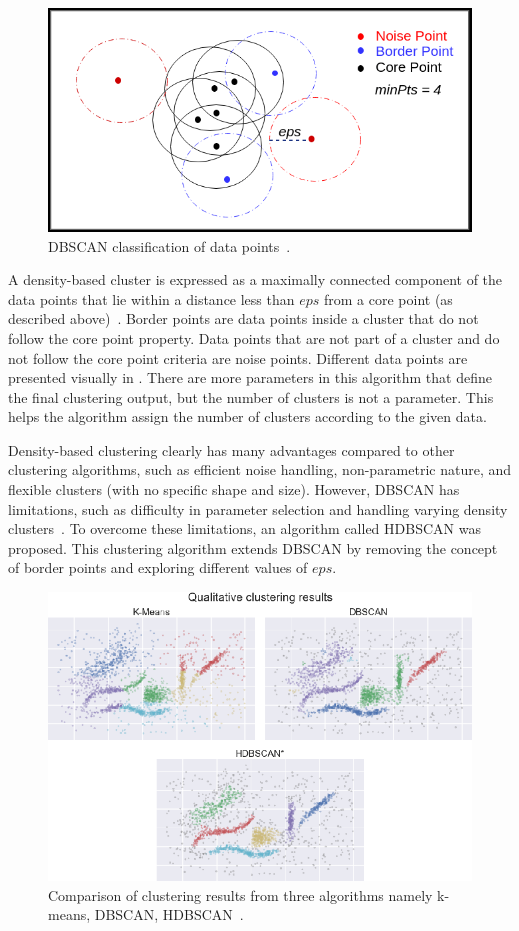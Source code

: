 \begin{description}
	
	\begin{figure}[h]
		\centering
		\includegraphics[width=.6\textwidth]{images/papers/dbscan.png}
		\caption[DBSCAN classification of data points.]{DBSCAN classification of data points~\cite{knoldusDBSCANClustering}. \label{fig:dbscan}}
	\end{figure}
	
	A density-based cluster is expressed as a maximally connected component of the data points that lie within a distance less than $eps$ from a core point (as described above)~\cite{campello2020density}. Border points are data points inside a cluster that do not follow the core point property. Data points that are not part of a cluster and do not follow the core point criteria are noise points. Different data points are presented visually in . There are more parameters in this algorithm that define the final clustering output, but the number of clusters is not a parameter. This helps the algorithm assign the number of clusters according to the given data.

	
	Density-based clustering clearly has many advantages compared to other clustering algorithms, such as efficient noise handling, non-parametric nature, and flexible clusters (with no specific shape and size). However, \ac{DBSCAN} has limitations, such as difficulty in parameter selection and handling varying density clusters~\cite{mcinnes2017accelerated}. To overcome these limitations, an algorithm called \ac{HDBSCAN} was proposed. This clustering algorithm extends \ac{DBSCAN} by removing the concept of border points and exploring different values of $eps$. 
	
		\begin{figure}[h]
		\centering
		\includegraphics[width=.8\textwidth]{images/papers/hdbscan.png}
		\caption[K-means vs DBSCAN vs HDBSCAN.]{Comparison of clustering results from three algorithms namely k-means, DBSCAN, HDBSCAN~\cite{mcinnes2017accelerated}.  \label{fig:hdbscan}}
	\end{figure}
	

\end{description}
